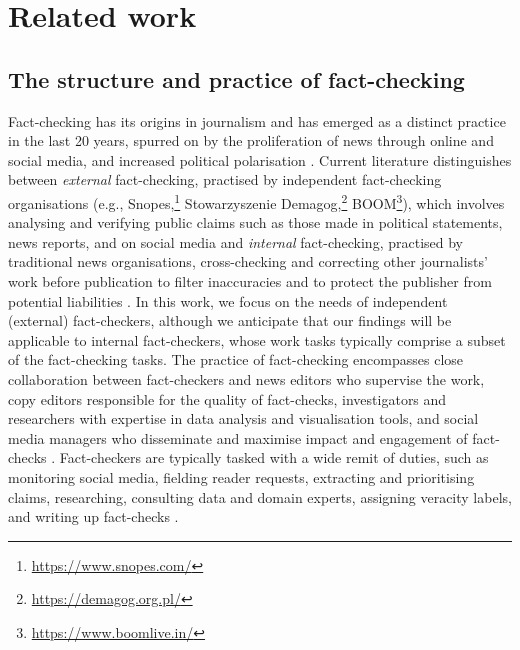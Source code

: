 \section{Related work}
\label{relwork}

\subsection{The structure and practice of fact-checking} \label{relwork:factchecking}
Fact-checking has its origins in journalism and has emerged as a distinct practice in the last 20 years, spurred on by the proliferation of news through online and social media, and increased political polarisation \cite{smith2004factcheckersbible,graves2019fact,amazeen2020journalistic}.
Current literature distinguishes between
\textit{external} fact-checking, practised by independent fact-checking organisations 
(e.g., Snopes,\footnote{\url{https://www.snopes.com/}} Stowarzyszenie Demagog,\footnote{\url{https://demagog.org.pl/}} BOOM\footnote{\url{https://www.boomlive.in/}}), which involves analysing and verifying public claims such as those made in political statements, news reports, and on social media and
\textit{internal} fact-checking, practised by traditional news organisations, cross-checking and correcting other journalists' work before publication to filter inaccuracies and to protect the publisher from potential liabilities
\cite{graves2019fact,juneja2022human}.
In this work, we focus on the needs of independent (external) fact-checkers, although we anticipate that our findings will be applicable to internal fact-checkers, whose work tasks typically comprise a subset of the fact-checking tasks.
The practice of fact-checking encompasses close collaboration between fact-checkers and news editors who supervise the work, copy editors responsible for the quality of fact-checks, investigators and researchers with expertise in data analysis and visualisation tools, and social media managers who disseminate and maximise impact and engagement of fact-checks \cite{juneja2022human}. 
Fact-checkers are typically tasked with a wide remit of duties, such as monitoring social media, fielding reader requests, extracting and prioritising claims, researching, consulting data and domain experts, assigning veracity labels, and writing up fact-checks \cite{juneja2022human, micallef2022true, graves2017anatomy}.
